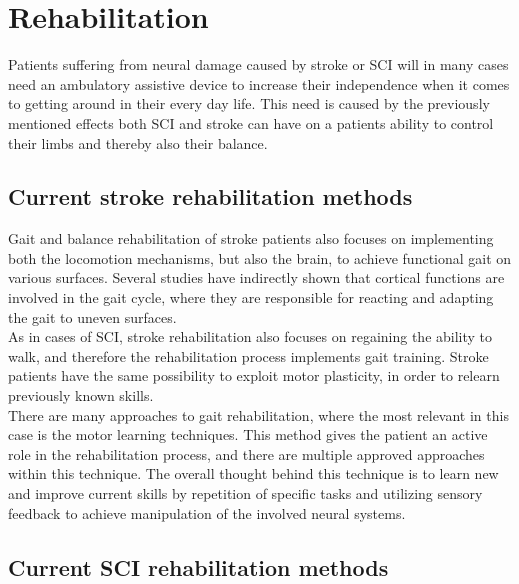 \section{Rehabilitation}

Patients suffering from neural damage caused by stroke or SCI will in many cases need an ambulatory assistive device to increase their independence when it comes to getting around in their every day life. \cite{Sandrini2018,Michael2005} This need is caused by the previously mentioned effects both SCI and stroke can have on a patients ability to control their limbs and thereby also their balance. 

\subsection{Current stroke rehabilitation methods}

Gait and balance rehabilitation of stroke patients also focuses on implementing both the locomotion mechanisms, but also the brain, to achieve functional gait on various surfaces. Several studies have indirectly shown that cortical functions are involved in the gait cycle, where they are responsible for reacting and adapting the gait to uneven surfaces. \cite{Belda2011} \\
As in cases of SCI, stroke rehabilitation also focuses on regaining the ability to walk, and therefore the rehabilitation process implements gait training. Stroke patients have the same possibility to exploit motor plasticity, in order to relearn previously known skills. \cite{Belda2011} \\
There are many approaches to gait rehabilitation, where the most relevant in this case is the motor learning techniques. This method gives the patient an active role in the rehabilitation process, and there are multiple approved approaches within this technique. The overall thought behind this technique is to learn new and improve current skills by repetition of specific tasks and utilizing sensory feedback to achieve manipulation of the involved neural systems. \cite{Belda2011}

\subsection{Current SCI rehabilitation methods}

